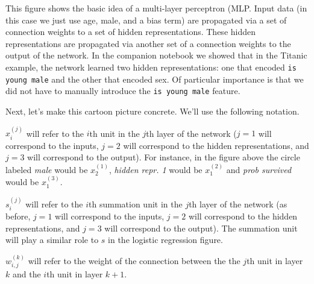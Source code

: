 \documentclass[assignment06_Solutions]{subfiles}
\begin{document}
This figure shows the basic idea of a multi-layer perceptron (MLP. Input data (in this case we just use age, male, and a bias term) are propagated via a set of connection weights to a set of hidden representations.  These hidden representations are propagated via another set of a connection weights to the output of the network.   In the companion notebook we showed that in the Titanic example, the network learned two hidden representations: one that encoded {\tt is young male} and the other that encoded sex.  Of particular importance is that we did not have to manually introduce the {\tt is young male} feature.

Next, let's make this cartoon picture concrete.  We'll use the following notation.
\bi
\item $x^{(j)}_i$ will refer to the $i$th unit in the $j$th layer of the network ($j=1$ will correspond to the inputs, $j=2$ will correspond to the hidden representations, and $j=3$ will correspond to the output).  For instance, in the figure above the circle labeled \emph{male} would be $x^{(1)}_2$, \emph{hidden repr. 1} would be $x^{(2)}_1$ and \emph{prob survived} would be $x^{(3)}_1$.
\item $s^{(j)}_i$ will refer to the $i$th summation unit in the $j$th layer of the network (as before, $j=1$ will correspond to the inputs, $j=2$ will correspond to the hidden representations, and $j=3$ will correspond to the output).  The summation unit will play a similar role to $s$ in the logistic regression figure.
\item $w^{(k)}_{i,j}$ will refer to the weight of the connection between the the $j$th unit in layer $k$ and the $i$th unit in layer $k+1$.
\ei
\end{document}
